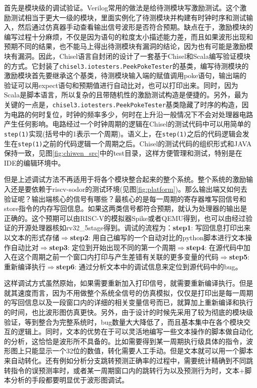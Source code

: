 首先是模块级的调试验证。Verilog常用的做法是给待测模块写激励测试。这个激励测试相当于更大一级的模块，里面实例化了待测模块并构建有时钟时序和测试输入，然后通过仿真器手动查看输出信号波形是否符合预期。缺点在于，激励模块的编写过程十分麻烦，不仅是因为语句的粒度太小描述能力差，而且如果波形出现和预期不同的结果，也不能马上得出待测模块有漏洞的结论，因为也有可能是激励模块有漏洞。因此，Chisel语言自封闭的设计了一套基于Chisel和Scala编写验证模块的方式。它封装了\texttt{\footnotesize{chisel3.iotesters.PeekPokeTester}}的基类，编写待测模块的激励模块首先要继承这个基类，待测模块输入端的赋值调用poke语句，输出端的验证可以用expect语句和预期值进行自动比对，也可以打印出来。同时，因为Scala是脚本语言，所以复杂的且带随机性的激励测试构造是便捷的。另外，最为关键的一点是，\texttt{\footnotesize{chisel3.iotesters.PeekPokeTester}}基类隐藏了时序的构造，因为电路的何时复位，时钟的频率多少，何时在上升沿一般情况下不会对处理器电路产生任何影响。电路经过一个时钟周期的逻辑在Chisel的测试代码中可以用简单的\texttt{step(1)}实现(括号中的1表示一个周期)。语义上，在\texttt{step(1)}之后的代码逻辑会发生在\texttt{step(1)}之前的代码逻辑一个周期之后。Chisel的测试代码的组织形式和JAVA保持一致，见图\ref{fig:chiwen_src}中的test目录，这样方便管理和测试，特别是在IDE的编辑环境中。

但是上述调试方法不再适用于将各个模块整合起来的整个系统。整个系统的激励输入还是要依赖于riscv-sodor的测试环境(见图\ref{fig:platform})。那么输出端又如何去验证呢？输出端核心的信号有哪些？最核心的是每一周期的寄存器堆写回信号和store指令的内存写回信息。如果这两类信号都符合预期，就认为处理器的输出是正确的。这个预期可以由RISC-V的模拟器Spike或者QEMU得到，也可以由经过验证的开源处理器核如rv32\_5stage得到。调试的流程为：\textbf{step1}: 写回信息打印出来以文本的形式存储$ \Rightarrow $\textbf{step2}: 用自己编写的一个自动对比的python脚本进行文本操作自动比对$ \Rightarrow $\textbf{step3}: 定位到开始出现不同的第一个周期$ \Rightarrow $\textbf{step4}: 在源代码中加入在这个周期之前一个窗口内打印与产生差错有关联的更多变量的代码$ \Rightarrow $\textbf{step5}: 重新编译执行$ \Rightarrow $\textbf{step6}: 通过分析文本中的调试信息来定位到源代码中的bug。

这样调试方式虽然原始，如果需要重新加入打印信号，就需要重新编译执行。但是就其速度而言，因为不用做整个系统全信号的仿真模拟，仅仅是打印出是每一周期的写回信息以及一段窗口内的详细的相关变量信号而已，就算加上重新编译和执行的时间，也比波形图仿真更快。另外，由于设计的时候先采用了较为彻底的模块级验证，等到整合为完整系统时，bug数量大大降低了，而且基本集中在各个模块交互的逻辑上。同时，文本的优势在于可以灵活地编写一些文本操作的脚本做自动化的分析，这恰恰是波形所不具备的。比如需要得到某一周期执行级具体的指令，波形图上只能显示一个32位的数值，转化需要人工手动。但是文本就可以用一个脚本来自动转化。还有例如分析分支跳转预测正确率的过程中，需要统计精确到不同跳转指令的误预测率时，或者某一周期窗口内的跳转行为以及预测行为时，文本+脚本分析的手段都要明显优于波形图调试。

